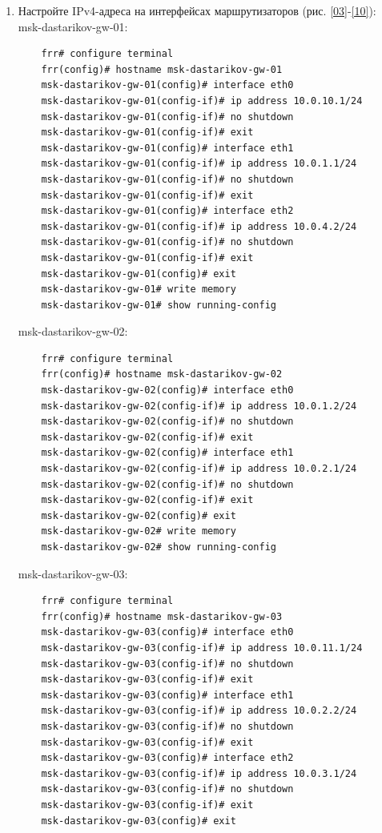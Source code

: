 \begin{enumerate}
\item Настройте IPv4-адреса на интерфейсах маршрутизаторов (рис. \ref{03}-\ref{10}):
  msk-dastarikov-gw-01:
\begin{verbatim}
    frr# configure terminal
    frr(config)# hostname msk-dastarikov-gw-01
    msk-dastarikov-gw-01(config)# interface eth0
    msk-dastarikov-gw-01(config-if)# ip address 10.0.10.1/24
    msk-dastarikov-gw-01(config-if)# no shutdown
    msk-dastarikov-gw-01(config-if)# exit
    msk-dastarikov-gw-01(config)# interface eth1
    msk-dastarikov-gw-01(config-if)# ip address 10.0.1.1/24
    msk-dastarikov-gw-01(config-if)# no shutdown
    msk-dastarikov-gw-01(config-if)# exit
    msk-dastarikov-gw-01(config)# interface eth2
    msk-dastarikov-gw-01(config-if)# ip address 10.0.4.2/24
    msk-dastarikov-gw-01(config-if)# no shutdown
    msk-dastarikov-gw-01(config-if)# exit
    msk-dastarikov-gw-01(config)# exit
    msk-dastarikov-gw-01# write memory
    msk-dastarikov-gw-01# show running-config
\end{verbatim}
  msk-dastarikov-gw-02:
\begin{verbatim}
    frr# configure terminal
    frr(config)# hostname msk-dastarikov-gw-02
    msk-dastarikov-gw-02(config)# interface eth0
    msk-dastarikov-gw-02(config-if)# ip address 10.0.1.2/24
    msk-dastarikov-gw-02(config-if)# no shutdown
    msk-dastarikov-gw-02(config-if)# exit
    msk-dastarikov-gw-02(config)# interface eth1
    msk-dastarikov-gw-02(config-if)# ip address 10.0.2.1/24
    msk-dastarikov-gw-02(config-if)# no shutdown
    msk-dastarikov-gw-02(config-if)# exit
    msk-dastarikov-gw-02(config)# exit
    msk-dastarikov-gw-02# write memory
    msk-dastarikov-gw-02# show running-config
\end{verbatim}
  msk-dastarikov-gw-03:
\begin{verbatim}
    frr# configure terminal
    frr(config)# hostname msk-dastarikov-gw-03
    msk-dastarikov-gw-03(config)# interface eth0
    msk-dastarikov-gw-03(config-if)# ip address 10.0.11.1/24
    msk-dastarikov-gw-03(config-if)# no shutdown
    msk-dastarikov-gw-03(config-if)# exit
    msk-dastarikov-gw-03(config)# interface eth1
    msk-dastarikov-gw-03(config-if)# ip address 10.0.2.2/24
    msk-dastarikov-gw-03(config-if)# no shutdown
    msk-dastarikov-gw-03(config-if)# exit
    msk-dastarikov-gw-03(config)# interface eth2
    msk-dastarikov-gw-03(config-if)# ip address 10.0.3.1/24
    msk-dastarikov-gw-03(config-if)# no shutdown
    msk-dastarikov-gw-03(config-if)# exit
    msk-dastarikov-gw-03(config)# exit

\end{verbatim}
\end{enumerate}
